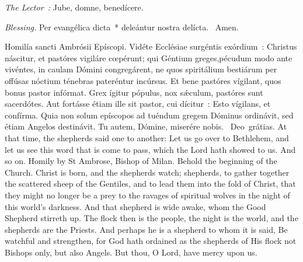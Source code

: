 {{  }

  {
    \bigskip
    {
    }
    \medskip

    \emph{The Lector~:} Jube, domne, benedícere.

    \emph{Blessing.} Per evangélica dicta~* deleántur nostra delícta. \Rbar{}~Amen.
  }

  \bigskip{}
  {


  }

  {

    \begin{parcolumns}[rulebetween,colwidths={1=.45\linewidth}]{2}
    {Homilía sancti Ambrósii Epíscopi.}%
    {Vidéte Ecclésiae surgéntis exórdium~: Christus náscitur, et pastóres vigiláre cœpérunt; qui Géntium greges,}{pécudum modo ante vivéntes, in caulam Dómini congregárent, ne quos spiritálium bestiárum per offúsas nóctium ténebras pateréntur incúrsus. Et bene pastóres vígilant, quos bonus pastor infórmat. Grex ígitur pópulus, nox sǽculum, pastóres sunt sacerdótes. Aut fortásse étiam ille sit pastor, cui dícitur~: Esto vígilans, et confírma. Quia non solum epíscopos ad tuéndum gregem Dóminus ordinávit, sed étiam Angelos destinávit.
      Tu autem, Dómine, miserére nobis.
      \Rbar{}~Deo~grátias.}
    {At that time, the shepherds said one to another: Let us go over to Bethlehem, and let us see this word that is come to pass, which the Lord hath showed to us. And so on.}
    {Homily by St Ambrose, Bishop of Milan.}
    {Behold the beginning of the Church. Christ is born, and the shepherds watch; shepherds, to gather together the scattered sheep of the Gentiles, and to lead them into the fold of Christ, that they might no longer be a prey to the ravages of spiritual wolves in the night of this world's darkness. And that shepherd is wide awake, whom the Good Shepherd stirreth up. The flock then is the people, the night is the world, and the shepherds are the Priests. And perhaps he is a shepherd to whom it is said, Be watchful and strengthen, for God hath ordained as the shepherds of His flock not Bishops only, but also Angels.
      But thou, O Lord, have mercy upon us.}
    \end{parcolumns}

}}
